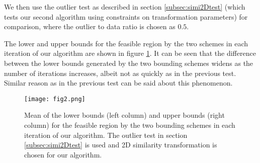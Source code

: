 \documentclass[11pt,bezier,]{article}
\begin{document}
We then use the outlier test  as described in section \ref{subsec:simi2Dtest} 
(which tests our second algorithm using constraints on transformation parameters)
for comparison,
where the outlier to data ratio is chosen as $0.5$.


The lower and upper bounds for the feasible region 
by the two  schemes in each iteration of
our algorithm are shown in  figure \ref{two_bounds_compare_alg2}.
It can be seen that the difference between the lower bounds  generated by the two bounding schemes widens
as the number of iterations increases,
albeit not as quickly  as in the previous test.
Similar reason as in the previous test can be said 
about this phenomenon.


\begin{figure}[ht]

\texttt{[image: fig2.png]}
% 



\caption{
Mean of the lower bounds (left column) and upper bounds (right column) for the feasible region by the two bounding schemes
in each iteration of our algorithm.
The outlier test in section \ref{subsec:simi2Dtest}  is used
and 2D similarity transformation is chosen for our algorithm.
%
%
\label{two_bounds_compare_alg2}
}
\end{figure}
\end{document}
